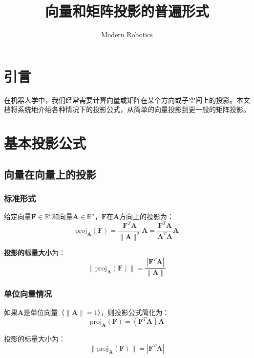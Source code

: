 \documentclass[12pt,a4paper]{article}
\title{向量和矩阵投影的普遍形式}
\author{Modern Robotics}
\date{}
\begin{document}
\maketitle

\section{引言}

在机器人学中，我们经常需要计算向量或矩阵在某个方向或子空间上的投影。本文档将系统地介绍各种情况下的投影公式，从简单的向量投影到更一般的矩阵投影。

\section{基本投影公式}

\subsection{向量在向量上的投影}

\subsubsection{标准形式}

给定向量$\bm{F} \in \mathbb{R}^n$和向量$\bm{A} \in \mathbb{R}^n$，$\bm{F}$在$\bm{A}$方向上的投影为：
\begin{equation}
\text{proj}_{\bm{A}}(\bm{F}) = \frac{\bm{F}^T \bm{A}}{\|\bm{A}\|^2} \bm{A} = \frac{\bm{F}^T \bm{A}}{\bm{A}^T \bm{A}} \bm{A}
\label{eq:vector_projection}
\end{equation}

\textbf{投影的标量大小}为：
\begin{equation}
\|\text{proj}_{\bm{A}}(\bm{F})\| = \frac{|\bm{F}^T \bm{A}|}{\|\bm{A}\|}
\end{equation}

\subsubsection{单位向量情况}

如果$\bm{A}$是单位向量（$\|\bm{A}\| = 1$），则投影公式简化为：
\begin{equation}
\text{proj}_{\bm{A}}(\bm{F}) = (\bm{F}^T \bm{A}) \bm{A}
\label{eq:unit_vector_projection}
\end{equation}

投影的标量大小为：
\begin{equation}
\|\text{proj}_{\bm{A}}(\bm{F})\| = |\bm{F}^T \bm{A}|
\end{equation}
\end{document}
